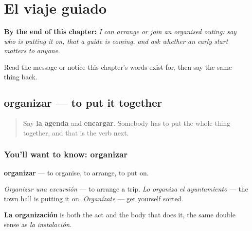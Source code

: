 
\chapter{El viaje guiado}
\label{ch:es-guia}

\begin{chapteropening}
\textbf{By the end of this chapter:} \emph{I can arrange or join an organised outing: say who is putting it on, that a guide is coming, and ask whether an early start matters to anyone.}

Read the message or notice this chapter's words exist for, then say the same thing back.
\end{chapteropening}

\section[organizar]{organizar — to put it together}

\label{lesson:ES-C463-organizar}



\begin{quote}
Say \textbf{la agenda} and \textbf{encargar}. Somebody has to put the whole thing together, and that is the verb next.
\end{quote}

\subsection*{You'll want to know: organizar}
\textbf{organizar} — to organise, to arrange, to put on.

\emph{Organizar una excursión} — to arrange a trip. \emph{Lo organiza el ayuntamiento} — the town hall is putting it on. \emph{Organízate} — get yourself sorted.

\textbf{La organización} is both the act and the body that does it, the same double sense as \emph{la instalación}.

